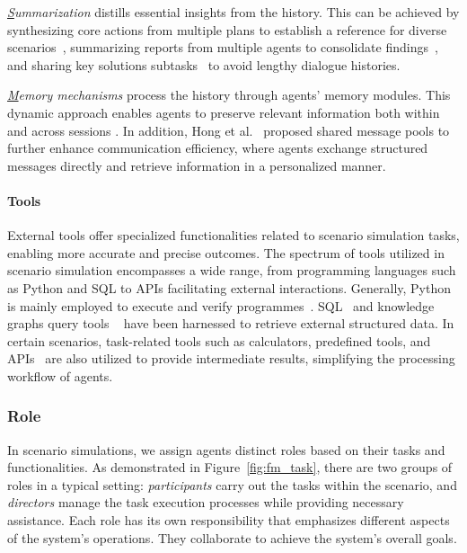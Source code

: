 \textit{{\ul Summarization}} distills essential insights from the history. This can be achieved by synthesizing core actions from multiple plans to establish a reference for diverse scenarios~\cite{zhu2023ghost}, summarizing reports from multiple agents to consolidate findings~\cite{tang2023medagents}, and sharing key solutions subtasks~\cite{qian2024chatdev} to avoid lengthy dialogue histories.

\textit{{\ul Memory mechanisms}} process the history through agents' memory modules. This dynamic approach enables agents to preserve relevant information both within and across sessions \cite{li2023tradinggpt,chen2023autoagents,liu2024skepticism,qian2024iterative,qian2024scaling,xie2024dreamfactory,lin2023agentsims,li2023metaagents}. In addition, Hong et al.~\cite{hong2023metagpt} proposed shared message pools to further enhance communication efficiency, where agents exchange structured messages directly and retrieve information in a personalized manner.

\paragraph{Tools}

External tools offer specialized functionalities related to scenario simulation tasks, enabling more accurate and precise outcomes. The spectrum of tools utilized in scenario simulation encompasses a wide range, from programming languages such as Python and SQL to APIs facilitating external interactions. Generally, Python is mainly employed to execute and verify programmes~\cite{qian2024chatdev,hong2023metagpt,wu2023autogen}. SQL~\cite{zhuautotqa} and knowledge graphs query tools ~\cite{baek2024researchagent,ma2024debate} have been harnessed to retrieve external structured data. In certain scenarios, task-related tools such as calculators, predefined tools, and APIs~\cite{chen2023autoagents,xie2023openagents}  are also utilized to provide intermediate results, simplifying the processing workflow of agents.

\subsubsection{Role}

In scenario simulations, we assign agents distinct roles based on their tasks and functionalities.
As demonstrated in Figure~\ref{fig:fm_task}, there are two groups of roles in a typical setting: \textit{participants} carry out the tasks within the scenario, and \textit{directors} manage the task execution processes while providing necessary assistance.
Each role has its own responsibility that emphasizes different aspects of the system's operations.
They collaborate to achieve the system's overall goals.


